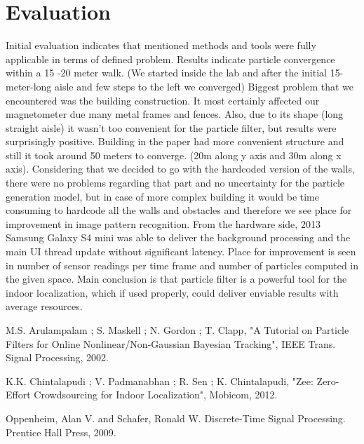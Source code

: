 \documentclass[conference]{IEEEtran}
\begin{document}
\section{Evaluation}
Initial evaluation indicates that mentioned methods and tools were fully applicable in terms of defined problem. Results indicate particle convergence within a 15 -20 meter walk. (We started inside the lab and after the initial 15-meter-long aisle and few steps to the left we converged) Biggest problem that we encountered was the building construction. It most certainly affected our magnetometer due many metal frames and fences. Also, due to its shape (long straight aisle) it wasn’t too convenient for the particle filter, but results were surprisingly positive. Building in the paper had more convenient structure and still it took around 50 meters to converge. (20m along y axis and 30m along x axis). Considering that we decided to go with the hardcoded version of the walls, there were no problems regarding that part and no uncertainty for the particle generation model, but in case of more complex building it would be time consuming to hardcode all the walls and obstacles and therefore we see place for improvement in image pattern recognition. From the hardware side, 2013 Samsung Galaxy S4 mini was able to deliver the background processing and the main UI thread update without significant latency. Place for improvement is seen in number of sensor readings per time frame and number of particles computed in the given space.  Main conclusion is that particle filter is a powerful tool for the indoor localization, which if used properly, could deliver enviable results with average resources.



\begin{thebibliography}{00}
  M.S. Arulampalam ; S. Maskell ; N. Gordon ; T. Clapp, "A Tutorial on Particle Filters for Online Nonlinear/Non-Gaussian Bayesian Tracking", IEEE Trans. Signal Processing, 2002.


  K.K. Chintalapudi ; V. Padmanabhan ; R. Sen ; K. Chintalapudi, "Zee: Zero-Effort Crowdsourcing for Indoor Localization", Mobicom, 2012.

 Oppenheim, Alan V. and Schafer, Ronald W. Discrete-Time Signal Processing. Prentice Hall Press, 2009.

\end{thebibliography}
\end{document}
